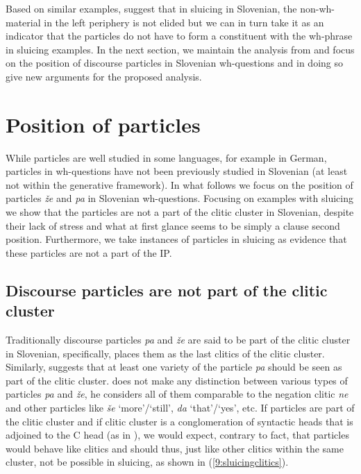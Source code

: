 \documentclass[output=paper,modfonts,newtxmath,hidelinks]{langscibook}
\begin{document}
\noindent Based on similar examples, \cite{marusicetal2015} suggest that in sluicing in Slovenian, the non-wh-material in the left periphery is not elided but we can in turn take it as an indicator that the particles do not have to form a constituent with the wh-phrase in sluicing examples. In the next section, we maintain the analysis from \cite{marusicetal2015} and focus on the position of discourse particles in Slovenian wh-questions and in doing so give new arguments for the proposed analysis.  

\section{Position of particles}\label{9:s4}

While particles are well studied in some languages, for example in German, particles in wh-questions have not been previously studied in Slovenian (at least not within the generative framework). In what follows we focus on the position of particles \textit{že} and \textit{pa} in Slovenian wh-questions. Focusing on examples with sluicing we show that the particles are not a part of the clitic cluster in Slovenian, despite their lack of stress and what at first glance seems to be simply a clause second position. Furthermore, we take instances of particles in sluicing as evidence that these particles are not a part of the IP.  

\subsection{Discourse particles are not part of the clitic cluster}

Traditionally discourse particles \textit{pa} and \textit{že} are said to be part of the clitic cluster in Slovenian, specifically, \cite{toporisic2000} places them as the last clitics of the clitic cluster. Similarly, \cite{oresnik1985naniz} suggests that at least one variety of the particle \textit{pa} should be seen as part of the clitic cluster. \cite{toporisic2000} does not make any distinction between various types of particles \textit{pa} and \textit{že}, he considers all of them comparable to the negation clitic \textit{ne} and other particles like \textit{še} `more'/`still', \textit{da} `that'/`yes', etc. If particles are part of the clitic cluster and if clitic cluster is a conglomeration of syntactic heads that is adjoined to the C head (as in \citealt{goldensheppard2000}), we would expect, contrary to fact, that particles would behave like clitics and should thus, just like other clitics within the same cluster, not be possible in sluicing, as shown in  (\ref{9:sluicingclitics}). 
\end{document}
